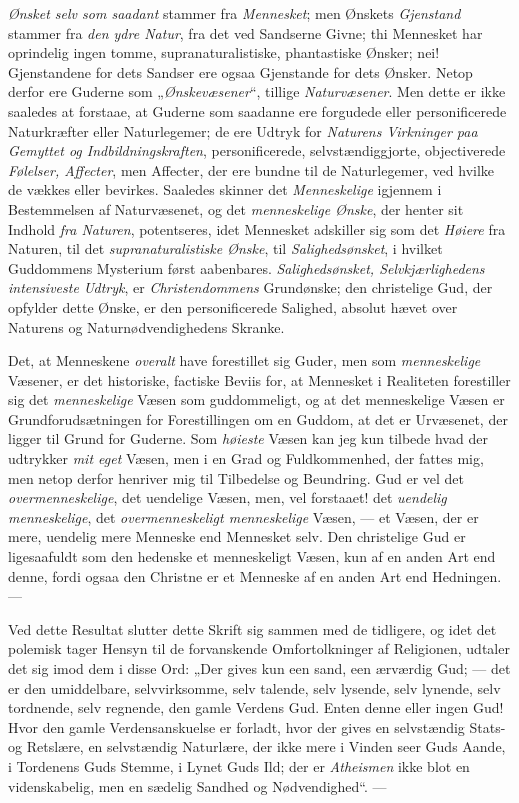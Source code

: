 \emph{Ønsket selv som saadant} stammer fra \emph{Mennesket}; men Ønskets
\emph{Gjenstand} stammer fra \emph{den ydre Natur}, fra det ved Sandserne Givne; thi
Mennesket har oprindelig ingen tomme, supranaturalistiske, phantastiske Ønsker;
nei! Gjenstandene for dets Sandser ere ogsaa Gjenstande for dets Ønsker. Netop
derfor ere Guderne som „\emph{Ønskevæsener}“, tillige \emph{Naturvæsener}. Men dette
er ikke saaledes at forstaae, at Guderne som saadanne ere forgudede eller
personificerede Naturkræfter eller Naturlegemer; de ere Udtryk for \emph{Naturens
Virkninger paa Gemyttet og Indbildningskraften}, personificerede,
selvstændiggjorte, objectiverede \emph{Følelser, Affecter}, men Affecter, der ere
bundne til de Naturlegemer, ved hvilke de vækkes eller bevirkes. Saaledes
skinner det \emph{Menneskelige} igjennem i Bestemmelsen af Naturvæsenet, og det
\emph{menneskelige Ønske}, der henter sit Indhold \emph{fra Naturen}, potentseres,
idet Mennesket adskiller sig som det \emph{Høiere} fra Naturen, til det
\emph{supranaturalistiske Ønske}, til \emph{Salighedsønsket}, i hvilket Guddommens
Mysterium først aabenbares. \emph{Salighedsønsket, Selvkjærlighedens intensiveste
Udtryk}, er \emph{Christendommens} Grundønske; den christelige Gud, der opfylder
dette Ønske, er den personificerede Salighed, absolut hævet over Naturens og
Naturnødvendighedens Skranke.

Det, at Menneskene \emph{overalt} have forestillet sig Guder, men som
\emph{menneskelige} Væsener, er det historiske, factiske Beviis for, at Mennesket
i Realiteten forestiller sig det \emph{menneskelige} Væsen som guddommeligt, og at
det menneskelige Væsen er Grundforudsætningen for Forestillingen om en Guddom,
at det er Urvæsenet, der ligger til Grund for
 \setcounter{footnote}{0}%
Guderne. Som \emph{høieste} Væsen kan jeg kun tilbede hvad der udtrykker
\emph{mit eget} Væsen, men i en Grad og Fuldkommenhed, der fattes mig, men netop
derfor henriver mig til Tilbedelse og Beundring. Gud er vel det
\emph{overmenneskelige}, det uendelige Væsen, men, vel forstaaet! det
\emph{uendelig menneskelige}, det \emph{overmenneskeligt menneskelige} Væsen, ---
et Væsen, der er mere, uendelig mere Menneske end Mennesket selv. Den christelige
Gud er ligesaafuldt som den hedenske et menneskeligt Væsen, kun af en anden Art
end denne, fordi ogsaa den Christne er et Menneske af en anden Art end
Hedningen. ---

Ved dette Resultat slutter dette Skrift sig sammen med de tidligere, og idet det
polemisk tager Hensyn til de forvanskende Omfortolkninger af Religionen, udtaler
det sig imod dem i disse Ord: „Der gives kun een sand, een ærværdig Gud; --- det
er den umiddelbare, selvvirksomme, selv talende, selv lysende, selv lynende, selv
tordnende, selv regnende, den gamle Verdens Gud. Enten denne eller ingen Gud!
Hvor den gamle Verdensanskuelse er forladt, hvor der gives en selvstændig Stats-
og Retslære, en selvstændig Naturlære, der ikke mere i Vinden seer Guds Aande, i
Tordenens Guds Stemme, i Lynet Guds Ild; der er \emph{Atheismen} ikke blot en
videnskabelig, men en sædelig Sandhed og Nødvendighed“. ---

